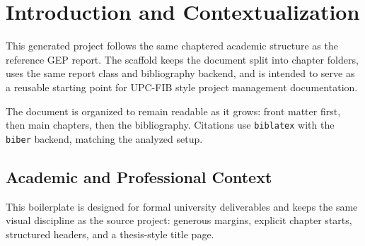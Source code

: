 \section{Introduction and Contextualization}
\label{sec:introduction-and-contextualization}

This generated project follows the same chaptered academic structure as the reference GEP report. The scaffold keeps the document split into chapter folders, uses the same report class and bibliography backend, and is intended to serve as a reusable starting point for UPC-FIB style project management documentation.

The document is organized to remain readable as it grows: front matter first, then main chapters, then the bibliography. Citations use \texttt{biblatex} with the \texttt{biber} backend, matching the analyzed setup\cite{trivedi2023ircot}.

\subsection{Academic and Professional Context}
\label{subsec:context}

This boilerplate is designed for formal university deliverables and keeps the same visual discipline as the source project: generous margins, explicit chapter starts, structured headers, and a thesis-style title page.
